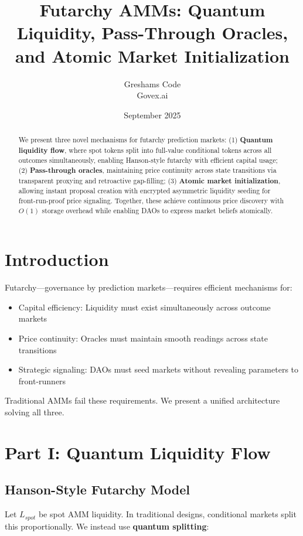 \documentclass{article}
\title{Futarchy AMMs: Quantum Liquidity, Pass-Through Oracles, and Atomic Market Initialization}
\author{Greshams Code\\Govex.ai}
\date{September 2025}
\begin{document}
\maketitle

\begin{abstract}
We present three novel mechanisms for futarchy prediction markets: (1) \textbf{Quantum liquidity flow}, where spot tokens split into full-value conditional tokens across all outcomes simultaneously, enabling Hanson-style futarchy with efficient capital usage; (2) \textbf{Pass-through oracles}, maintaining price continuity across state transitions via transparent proxying and retroactive gap-filling; (3) \textbf{Atomic market initialization}, allowing instant proposal creation with encrypted asymmetric liquidity seeding for front-run-proof price signaling. Together, these achieve continuous price discovery with $O(1)$ storage overhead while enabling DAOs to express market beliefs atomically.
\end{abstract}

\section{Introduction}

Futarchy—governance by prediction markets—requires efficient mechanisms for:
\begin{itemize}
\item Capital efficiency: Liquidity must exist simultaneously across outcome markets
\item Price continuity: Oracles must maintain smooth readings across state transitions
\item Strategic signaling: DAOs must seed markets without revealing parameters to front-runners
\end{itemize}

Traditional AMMs fail these requirements. We present a unified architecture solving all three.

\section{Part I: Quantum Liquidity Flow}

\subsection{Hanson-Style Futarchy Model}

Let $L_{spot}$ be spot AMM liquidity. In traditional designs, conditional markets split this proportionally. We instead use \textbf{quantum splitting}:
\end{document}
